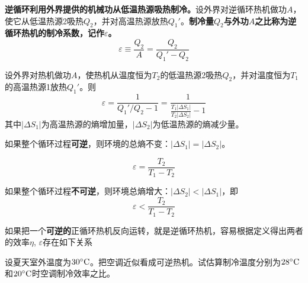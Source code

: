 \documentclass[CJK]{beamer}
\begin{document}
\begin{frame}
\bchL


{\bf 逆循环利用外界提供的机械功从低温热源吸热制冷。}设外界对逆循环热机做功$A$，使它从低温热源2吸热$Q_2$，并对高温热源放热$Q_1'$。{\bf 制冷量$Q_2$与外功$A$之比称为逆循环热机的制冷系数，记作$\varepsilon$。}
$$\varepsilon \equiv \frac{Q_2}{A}=\frac{Q_2}{Q_1'-Q_2} $$

\echL
\end{frame}


\begin{frame}
\bch
{\small
设外界对热机做功$A$，使热机从温度恒为$T_2$的低温热源2吸热$Q_2$，并对温度恒为$T_1$的高温热源1放热$Q_1'$。则
$$\varepsilon = \frac{1}{Q_1'/Q_2 - 1} = \frac{1}{\frac{T_1|\Delta S_1|}{T_2|\Delta S_2|}-1}$$
其中$|\Delta S_1|$为高温热源的熵增加量，$|\Delta S_2|$为低温热源的熵减少量。

如果整个循环过程{\bf 可逆}，则环境的总熵不变：$|\Delta S_1| = |\Delta S_2|$。

$$ \varepsilon = \frac{T_2}{T_1-T_2}$$

如果整个循环过程{\bf 不可逆}，则环境总熵增大：$|\Delta S_2| < |\Delta S_1|$，即
$$\varepsilon <  \frac{T_2}{T_1-T_2} $$
}
\ech
\end{frame}


\begin{frame}
\bchL
如果把一个{\bf 可逆的}正循环热机反向运转，就是逆循环热机，容易根据定义得出两者的效率$\eta$, $\varepsilon$存在如下关系

\echL
\end{frame}


\begin{frame}
\bchL


设夏天室外温度为$30^\circ \mathrm{C}$。把空调近似看成可逆热机。试估算制冷温度分别为$28^\circ \mathrm{C}$和$20^\circ \mathrm{C}$时空调制冷效率之比。

\echL
\end{frame}



\begin{frame}
\bch
{}
\ech
\end{frame}

\begin{frame}
\bch
{}
\ech
\end{frame}
\end{document}
